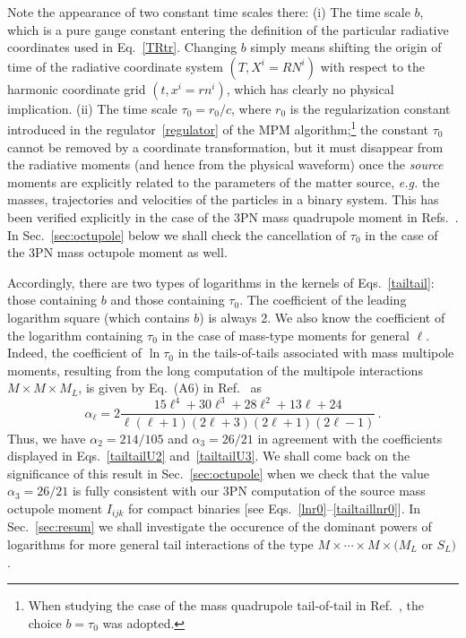 \documentclass[prd,preprint,superscriptaddress,tightenlines,nofootinbib,
  eqsecnum,showpacs]{revtex4}
\begin{document}
Note the appearance of two constant time scales there: (i) The time
scale $b$, which is a pure gauge constant entering the definition of
the particular radiative coordinates used in
Eq.~\eqref{TRtr}. Changing $b$ simply means shifting the origin of
time of the radiative coordinate system $(T,X^i=R N^i)$ with respect
to the harmonic coordinate grid $(t,x^i = r n^i)$, which has clearly
no physical implication. (ii) The time scale $\tau_0=r_0/c$, where
$r_0$ is the regularization constant introduced in the
regulator~\eqref{regulator} of the MPM algorithm;\footnote{When
  studying the case of the mass quadrupole tail-of-tail in
  Ref.~\cite{B98tail}, the choice $b=\tau_0$ was adopted.} the
constant $\tau_0$ cannot be removed by a coordinate transformation,
but it must disappear from the radiative moments (and hence from the
physical waveform) once the \textit{source} moments are explicitly
related to the parameters of the matter source, \textit{e.g.} the
masses, trajectories and velocities of the particles in a binary
system. This has been verified explicitly in the case of the 3PN mass
quadrupole moment in Refs.~\cite{BIJ02, BI04mult}. In
Sec.~\eqref{sec:octupole} below we shall check the cancellation of
$\tau_0$ in the case of the 3PN mass octupole moment as well.

Accordingly, there are two types of logarithms in the kernels of
Eqs.~\eqref{tailtail}: those containing $b$ and those containing
$\tau_0$. The coefficient of the leading logarithm square (which
contains $b$) is always 2.  We also know the coefficient of the
logarithm containing $\tau_0$ in the case of mass-type moments for
general $\ell$. Indeed, the coefficient of $\ln\tau_0$ in the
tails-of-tails associated with mass multipole moments, resulting from
the long computation of the multipole interactions $M\times M\times
M_L$, is given by Eq.~(A6) in Ref.~\cite{BD88} as
%
\begin{equation}\label{alphaell}
\alpha_\ell = 2\frac{15\ell^4+30\ell^3 +
  28\ell^2+13\ell+24}{\ell(\ell+1)(2\ell+3)(2\ell+1)(2\ell-1)}\,.
\end{equation}
%
Thus, we have $\alpha_2=214/105$ and $\alpha_3=26/21$ in agreement
with the coefficients displayed in Eqs.~\eqref{tailtailU2}
and~\eqref{tailtailU3}. We shall come back on the significance of this
result in Sec.~\eqref{sec:octupole} when we check that the value
$\alpha_3=26/21$ is fully consistent with our 3PN computation of the
source mass octupole moment $I_{ijk}$ for compact binaries [see
  Eqs.~\eqref{lnr0}--\eqref{tailtaillnr0}]. In Sec.~\ref{sec:resum} we
shall investigate the occurence of the dominant powers of logarithms
for more general tail interactions of the type $M\times \cdots \times
M \times (M_L$ or $S_L)$.
\end{document}
